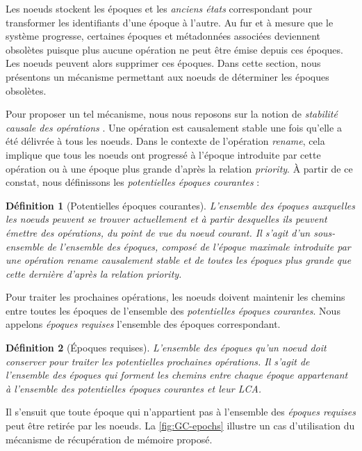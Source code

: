 \documentclass[12pt]{thesul}
\newtheorem{definition}{Définition}
\begin{document}
Les noeuds stockent les époques et les \emph{anciens états} correspondant pour transformer les identifiants d'une époque à l'autre.
Au fur et à mesure que le système progresse, certaines époques et métadonnées associées deviennent obsolètes puisque plus aucune opération ne peut être émise depuis ces époques.
Les noeuds peuvent alors supprimer ces époques.
Dans cette section, nous présentons un mécanisme permettant aux noeuds de déterminer les époques obsolètes.

Pour proposer un tel mécanisme, nous nous reposons sur la notion de \emph{stabilité causale des opérations} \cite{10.1007/978-3-662-43352-2_11}.
Une opération est causalement stable une fois qu'elle a été délivrée à tous les noeuds.
Dans le contexte de l'opération \emph{rename}, cela implique que tous les noeuds ont progressé à l'époque introduite par cette opération ou à une époque plus grande d'après la relation \emph{priority}.
À partir de ce constat, nous définissons les \emph{potentielles époques courantes} :

\begin{definition}[Potentielles époques courantes]
  L'ensemble des époques auxquelles les noeuds peuvent se trouver actuellement et à partir desquelles ils peuvent émettre des opérations, du point de vue du noeud courant.
  Il s'agit d'un sous-ensemble de l'ensemble des époques, composé de l'époque maximale introduite par une opération \emph{rename} causalement stable et de toutes les époques plus grande que cette dernière d'après la relation \emph{priority}.
\end{definition}

Pour traiter les prochaines opérations, les noeuds doivent maintenir les chemins entre toutes les époques de l'ensemble des \emph{potentielles époques courantes}.
Nous appelons \emph{époques requises} l'ensemble des époques correspondant.

\begin{definition}[Époques requises]
  L'ensemble des époques qu'un noeud doit conserver pour traiter les potentielles prochaines opérations.
  Il s'agit de l'ensemble des époques qui forment les chemins entre chaque époque appartenant à l'ensemble des \emph{potentielles époques courantes} et leur \ac{LCA}.
\end{definition}

Il s'ensuit que toute époque qui n'appartient pas à l'ensemble des \emph{époques requises} peut être retirée par les noeuds.
La \autoref{fig:GC-epochs} illustre un cas d'utilisation du mécanisme de récupération de mémoire proposé.
\end{document}
